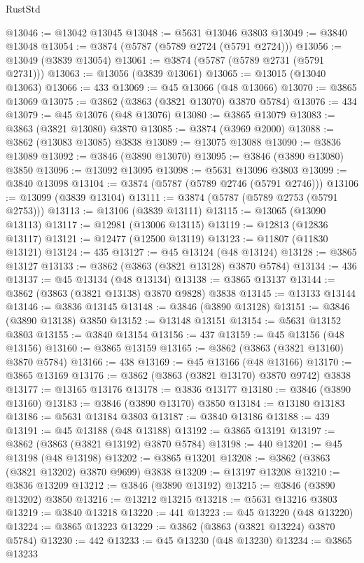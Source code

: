 \begin{lexlean}{RustStd}
\begin{coremodule}
@13046 := @13042 @13045
@13048 := @5631 @13046 @3803
@13049 := @3840 @13048
@13054 := @3874 (@5787 (@5789 @2724 (@5791 @2724)))
@13056 := @13049 (@3839 @13054)
@13061 := @3874 (@5787 (@5789 @2731 (@5791 @2731)))
@13063 := @13056 (@3839 @13061)
@13065 := @13015 (@13040 @13063)
@13066 := 433
@13069 := @45 @13066 (@48 @13066)
@13070 := @3865 @13069
@13075 := @3862 (@3863 (@3821 @13070) @3870 @5784)
@13076 := 434
@13079 := @45 @13076 (@48 @13076)
@13080 := @3865 @13079
@13083 := @3863 (@3821 @13080) @3870
@13085 := @3874 (@3969 @2000)
@13088 := @3862 (@13083 @13085) @3838
@13089 := @13075 @13088
@13090 := @3836 @13089
@13092 := @3846 (@3890 @13070)
@13095 := @3846 (@3890 @13080) @3850
@13096 := @13092 @13095
@13098 := @5631 @13096 @3803
@13099 := @3840 @13098
@13104 := @3874 (@5787 (@5789 @2746 (@5791 @2746)))
@13106 := @13099 (@3839 @13104)
@13111 := @3874 (@5787 (@5789 @2753 (@5791 @2753)))
@13113 := @13106 (@3839 @13111)
@13115 := @13065 (@13090 @13113)
@13117 := @12981 (@13006 @13115)
@13119 := @12813 (@12836 @13117)
@13121 := @12477 (@12500 @13119)
@13123 := @11807 (@11830 @13121)
@13124 := 435
@13127 := @45 @13124 (@48 @13124)
@13128 := @3865 @13127
@13133 := @3862 (@3863 (@3821 @13128) @3870 @5784)
@13134 := 436
@13137 := @45 @13134 (@48 @13134)
@13138 := @3865 @13137
@13144 := @3862 (@3863 (@3821 @13138) @3870 @9828) @3838
@13145 := @13133 @13144
@13146 := @3836 @13145
@13148 := @3846 (@3890 @13128)
@13151 := @3846 (@3890 @13138) @3850
@13152 := @13148 @13151
@13154 := @5631 @13152 @3803
@13155 := @3840 @13154
@13156 := 437
@13159 := @45 @13156 (@48 @13156)
@13160 := @3865 @13159
@13165 := @3862 (@3863 (@3821 @13160) @3870 @5784)
@13166 := 438
@13169 := @45 @13166 (@48 @13166)
@13170 := @3865 @13169
@13176 := @3862 (@3863 (@3821 @13170) @3870 @9742) @3838
@13177 := @13165 @13176
@13178 := @3836 @13177
@13180 := @3846 (@3890 @13160)
@13183 := @3846 (@3890 @13170) @3850
@13184 := @13180 @13183
@13186 := @5631 @13184 @3803
@13187 := @3840 @13186
@13188 := 439
@13191 := @45 @13188 (@48 @13188)
@13192 := @3865 @13191
@13197 := @3862 (@3863 (@3821 @13192) @3870 @5784)
@13198 := 440
@13201 := @45 @13198 (@48 @13198)
@13202 := @3865 @13201
@13208 := @3862 (@3863 (@3821 @13202) @3870 @9699) @3838
@13209 := @13197 @13208
@13210 := @3836 @13209
@13212 := @3846 (@3890 @13192)
@13215 := @3846 (@3890 @13202) @3850
@13216 := @13212 @13215
@13218 := @5631 @13216 @3803
@13219 := @3840 @13218
@13220 := 441
@13223 := @45 @13220 (@48 @13220)
@13224 := @3865 @13223
@13229 := @3862 (@3863 (@3821 @13224) @3870 @5784)
@13230 := 442
@13233 := @45 @13230 (@48 @13230)
@13234 := @3865 @13233

\end{coremodule}
\end{lexlean}
